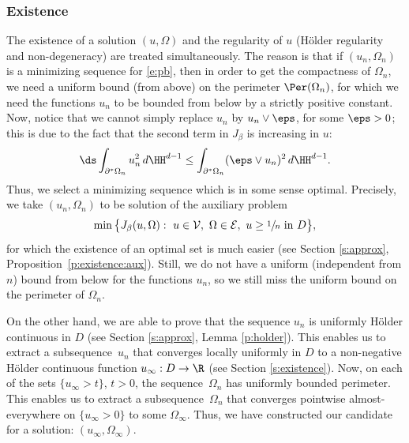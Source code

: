 \subsubsection{Existence}The existence of a solution $(u,\Omega)$ and the regularity of $u$ (Hölder regularity and non-degeneracy) are treated simultaneously. The reason is that if $(u_n,\Omega_n)$ is a minimizing sequence for \eqref{e:pb}, then in order to get the compactness of $\Omega_n$, we need a uniform bound (from above) on the perimeter $\Per(\Omega_n)$, for which we need the functions $u_n$ to be bounded from below by a strictly positive constant. Now, notice that we cannot simply replace $u_n$ by $u_n\vee \eps$, for some $\eps>0$; this is due to the fact that the second term in $J_\beta$ is increasing in $u$: \[\ds\int_{\partial^\ast\Omega_n}u_n^2\,d\HH^{d-1}\le \int_{\partial^\ast\Omega_n}(\eps\vee u_n)^2\,d\HH^{d-1}.\]
Thus, we select a minimizing sequence which is in some sense optimal. Precisely, we take $(u_n,\Omega_n)$ to be solution of the auxiliary problem
\begin{equation}\label{e:pb_approx_intro}
\min\big\{J_\beta(u,\Omega):\ u\in\mathcal V,\ \Omega\in\mathcal E,\ u\ge \sfrac1n\ \text{in}\ D\big\},
\end{equation}
for which the existence of an optimal set is much easier (see Section \ref{s:approx}, Proposition~\ref{p:existence:aux}). Still, we do not have a uniform (independent from $n$) bound from below for the functions $u_n$, so we still miss the uniform bound on the perimeter of $\Omega_n$.

On the other hand, we are able to prove that the sequence $u_n$ is uniformly Hölder continuous in $D$ (see Section \ref{s:approx}, Lemma \ref{p:holder}). This enables us to extract a subsequence~$u_n$ that converges locally uniformly in $D$ to a non-negative Hölder continuous function $u_\infty:D\to\R$ (see Section \ref{s:existence}). Now, on each of the sets $\{u_\infty>t\}$, $t>0$, the sequence~$\Omega_n$ has uniformly bounded perimeter. This enables us to extract a subsequence~$\Omega_n$ that converges pointwise almost-everywhere on $\{u_\infty>0\}$ to some $\Omega_\infty$. Thus, we have constructed our candidate for a solution: $(u_\infty,\Omega_\infty)$.

